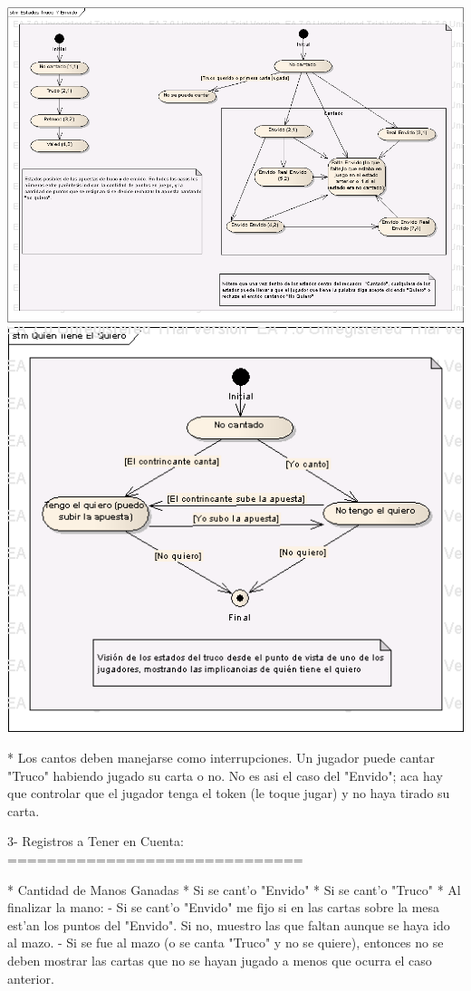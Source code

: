 \includegraphics{Estados Truco Y Envido.png}
\includegraphics{Quien Tiene El Quiero.png}

* Los cantos deben manejarse como interrupciones. Un jugador puede cantar "Truco" habiendo jugado su carta o no. No es asi el caso del "Envido"; aca hay que controlar que el jugador tenga el token (le toque jugar) y no haya tirado su carta.


3- Registros a Tener en Cuenta:
==============================

  * Cantidad de Manos Ganadas
  * Si se cant'o "Envido"
  * Si se cant'o "Truco"
  * Al finalizar la mano:
    - Si se cant'o "Envido" me fijo si en las cartas sobre la mesa est'an los puntos del "Envido". Si no, muestro las que faltan aunque se haya ido al mazo.
    - Si se fue al mazo (o se canta "Truco" y no se quiere), entonces no se deben mostrar las cartas que no se hayan jugado a menos que ocurra el caso anterior.


